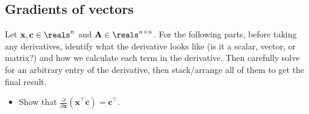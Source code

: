 \subsection{Gradients of vectors}

Let $\mathbf{x}, \mathbf{c} \in \reals^n$ and $\mathbf{A} \in \reals^{n \times n}$. 
For the following parts, before taking any derivatives, identify what the
derivative looks like (is it a scalar, vector, or matrix?) and how we calculate each term in the derivative. Then carefully solve for an arbitrary entry of the derivative, then stack/arrange all of them to get the final
result. 

\begin{itemize}
    \item Show that $\frac{\partial }{ \partial \mathbf{x} } \left( \mathbf{x}^\top \mathbf{c}  \right) = \mathbf{c}^\top$.\\
    \solution{
        \[
        \mathbf{x} \mathbf{c} = 
        \begin{bmatrix}
            x_0 \\
            x_1 \\
            x_2 \\
            \vdots\\
            x_n \\
        \end{bmatrix}
        \begin{bmatrix}
            c_0 \\
            c_1 \\
            c_2 \\
            \vdots\\
            c_n \\
        \end{bmatrix} 
        \rightarrow
        \mathbf{x}^\top \mathbf{c} = 
        \begin{bmatrix}
            x_0
            x_1 
            x_2 
            \cdots
            x_n
        \end{bmatrix}
        \begin{bmatrix}
            c_0 \\
            c_1 \\
            c_2 \\
            \vdots\\
            c_n \\
        \end{bmatrix}
        =
        \begin{bmatrix}
            c_0 x_0 + c_1 x_1+ c_2 x_2 \cdots c_n x_n

\end{bmatrix}\]}
\end{itemize}
